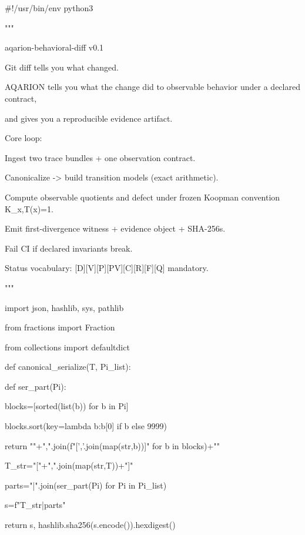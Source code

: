 #!/usr/bin/env python3

"""

aqarion-behavioral-diff v0.1

Git diff tells you what changed.

AQARION tells you what the change did to observable behavior under a declared contract,

and gives you a reproducible evidence artifact.


Core loop:






Ingest two trace bundles + one observation contract.






Canonicalize -> build transition models (exact arithmetic).






Compute observable quotients and defect under frozen Koopman convention K_{x,T(x)}=1.






Emit first-divergence witness + evidence object + SHA-256s.






Fail CI if declared invariants break.






Status vocabulary: [D][V][P][PV][C][R][F][Q] mandatory.

"""

import json, hashlib, sys, pathlib

from fractions import Fraction

from collections import defaultdict


def canonical_serialize(T, Pi_list):

def ser_part(Pi):

blocks=[sorted(list(b)) for b in Pi]

blocks.sort(key=lambda b:b[0] if b else 9999)

return "{"+",".join(f"[{','.join(map(str,b))}]" for b in blocks)+"}"

T_str="["+",".join(map(str,T))+"]"

parts="|".join(ser_part(Pi) for Pi in Pi_list)

s=f"{T_str}|{parts}"

return s, hashlib.sha256(s.encode()).hexdigest()


